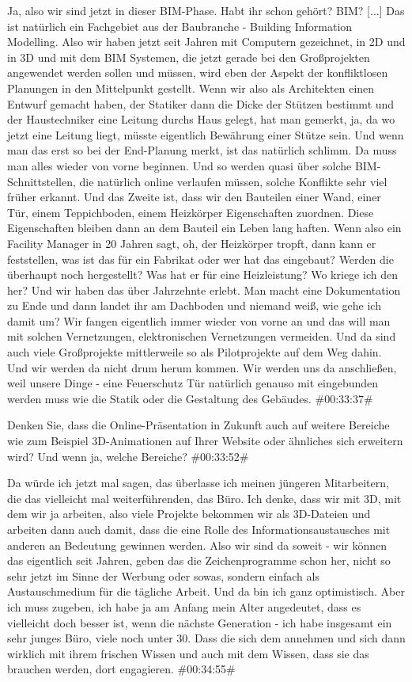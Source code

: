 \begin{description}
\Andre Ja, also wir sind jetzt in dieser BIM-Phase. Habt ihr schon gehört? BIM? [...] Das ist natürlich ein Fachgebiet aus der Baubranche - Building Information Modelling. Also wir haben jetzt seit Jahren mit Computern gezeichnet, in 2D und in 3D und mit dem BIM Systemen, die jetzt gerade bei den Großprojekten angewendet werden sollen und müssen, wird eben der Aspekt der konfliktlosen Planungen in den Mittelpunkt gestellt. Wenn wir also als Architekten einen Entwurf gemacht haben, der Statiker dann die Dicke der Stützen bestimmt und der Haustechniker eine Leitung durchs Haus gelegt, hat man gemerkt, ja, da wo jetzt eine Leitung liegt, müsste eigentlich Bewährung einer Stütze sein. Und wenn man das erst so bei der End-Planung merkt, ist das natürlich schlimm. Da muss man alles wieder von vorne beginnen. Und so werden quasi über solche BIM-Schnittstellen, die natürlich online verlaufen müssen, solche Konflikte sehr viel früher erkannt. Und das Zweite ist, dass wir den Bauteilen einer Wand, einer Tür, einem Teppichboden, einem Heizkörper Eigenschaften zuordnen. Diese Eigenschaften bleiben dann an dem Bauteil ein Leben lang haften. Wenn also ein Facility Manager in 20 Jahren sagt, oh, der Heizkörper tropft, dann kann er feststellen, was ist das für ein Fabrikat oder wer hat das eingebaut? Werden die überhaupt noch hergestellt? Was hat er für eine Heizleistung? Wo kriege ich den her? Und wir haben das über Jahrzehnte erlebt. Man macht eine Dokumentation zu Ende und dann landet ihr am Dachboden und niemand weiß, wie gehe ich damit um? Wir fangen eigentlich immer wieder von vorne an und das will man mit solchen Vernetzungen, elektronischen Vernetzungen vermeiden. Und da sind auch viele Großprojekte mittlerweile so als Pilotprojekte auf dem Weg dahin. Und wir werden da nicht drum herum kommen. Wir werden uns da anschließen, weil unsere Dinge - eine Feuerschutz Tür natürlich genauso mit eingebunden werden muss wie die Statik oder die Gestaltung des Gebäudes. \#00:33:37\#

\Fabian Denken Sie, dass die Online-Präsentation in Zukunft auch auf weitere Bereiche wie zum Beispiel 3D-Animationen auf Ihrer Website oder ähnliches sich erweitern wird? Und wenn ja, welche Bereiche? \#00:33:52\#

\Andre Da würde ich jetzt mal sagen, das überlasse ich meinen jüngeren Mitarbeitern, die das vielleicht mal weiterführenden, das Büro. Ich denke, dass wir mit 3D, mit dem wir ja arbeiten, also viele Projekte bekommen wir als 3D-Dateien und arbeiten dann auch damit, dass die eine Rolle des Informationsaustausches mit anderen an Bedeutung gewinnen werden. Also wir sind da soweit - wir können das eigentlich seit Jahren, geben das die Zeichenprogramme schon her, nicht so sehr jetzt im Sinne der Werbung oder sowas, sondern einfach als Austauschmedium für die tägliche Arbeit. Und da bin ich ganz optimistisch. Aber ich muss zugeben, ich habe ja am Anfang mein Alter angedeutet, dass es vielleicht doch besser ist, wenn die nächste Generation - ich habe insgesamt ein sehr junges Büro, viele noch unter 30. Dass die sich dem annehmen und sich dann wirklich mit ihrem frischen Wissen und auch mit dem Wissen, dass sie das brauchen werden, dort engagieren. \#00:34:55\#


\end{description}
